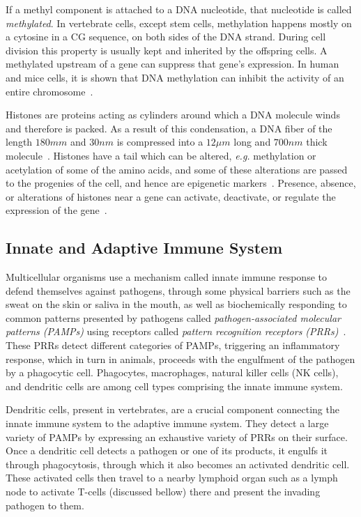 If a methyl component is attached to a DNA nucleotide, that nucleotide is called \emph{methylated}. In vertebrate cells, except stem cells, methylation happens mostly on a cytosine in a CG sequence, on both sides of the DNA strand. During cell division this property is usually kept and inherited by the offspring cells. A methylated upstream of a gene can suppress that gene's expression. In human and mice cells, it is shown that DNA methylation can inhibit the activity of an entire chromosome~\cite[Ch. 7]{the-cell}.

Histones are proteins acting as cylinders around which a DNA molecule winds and therefore is packed. As a result of this condensation, a DNA fiber of the length $180mm$ and $30nm$ is compressed into a $12\mu m$ long and $700nm$ thick molecule~\cite{redon2002histone}. Histones have a tail which can be altered, \emph{e.g.} methylation or acetylation of some of the amino acids, and some of these alterations are passed to the progenies of the cell, and hence are epigenetic markers~\cite{turner2000histone, berger2009operational, moazed2011mechanisms}. Presence, absence, or alterations of histones near a gene can activate, deactivate, or regulate the expression of the gene~\cite{turner2000histone}.


\subsection{Innate and Adaptive Immune System}
\label{sec:bkg:immune-system}
Multicellular organisms use a mechanism called innate immune response to defend themselves against pathogens, through some physical barriers such as the sweat on the skin or saliva in the mouth, as well as biochemically responding to common patterns presented by pathogens called \emph{pathogen-associated molecular patterns (PAMPs)} using receptors called \emph{pattern recognition receptors (PRRs)}~\cite[Ch. 24]{the-cell}. These PRRs detect different categories of PAMPs, triggering an inflammatory response, which in turn in animals, proceeds with the engulfment of the pathogen by a phagocytic cell. Phagocytes, macrophages, natural killer cells (NK cells), and dendritic cells are among cell types comprising the innate immune system.

Dendritic cells, present in vertebrates, are a crucial component connecting the innate immune system to the adaptive immune system. They detect a large variety of PAMPs by expressing an exhaustive variety of PRRs on their surface. Once a dendritic cell detects a pathogen or one of its products, it engulfs it through phagocytosis, through which it also becomes an activated dendritic cell. These activated cells then travel to a nearby lymphoid organ such as a lymph node to activate T-cells (discussed bellow) there and present the invading pathogen to them.

